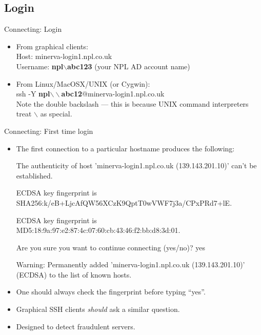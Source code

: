 \subsection{Login}
\begin{frame}{Connecting: Login}
\begin{itemize}
\item From graphical clients:\hfill\\
Host: \alert{minerva-login1.npl.co.uk}\hfill\\
Username: \alert{\textbf{npl$\backslash$abc123}} (your NPL AD account name)
\pause
\item From Linux/MacOSX/UNIX (or Cygwin):\hfill\\\medskip
  \alert{ssh -Y \textbf{npl$\backslash\backslash$abc12}@minerva-login1.npl.co.uk}\hfill\\\medskip
  Note the double backslash --- this is because UNIX command interpreters treat $\backslash$ as special.
\end{itemize}
\end{frame}

\begin{frame}{Connecting: First time login}
\begin{itemize}
\item{The first connection to a particular hostname produces the following:}
\begin{semiverbatim}\tiny
The authenticity of host 'minerva-login1.npl.co.uk (139.143.201.10)' can't be established.


ECDSA key fingerprint is {SHA256:k/eB+LjcAfQW56XCzK9QptT0wVWF7j3a/CPxPRd7+lE}.

ECDSA key fingerprint is {MD5:18:9a:97:e2:87:4c:07:60:cb:43:46:f2:bb:d8:3d:01}.


Are you sure you want to continue connecting (yes/no)? {yes}

Warning: Permanently added 'minerva-login1.npl.co.uk (139.143.201.10)' (ECDSA) to the list of known hosts.
\end{semiverbatim}
\smallskip\item{\alert{One should always check the fingerprint before typing ``yes''.}}
\item{Graphical SSH clients \emph{should} ask a similar question.}
\item{Designed to detect fraudulent servers.}
\end{itemize}
\end{frame}

